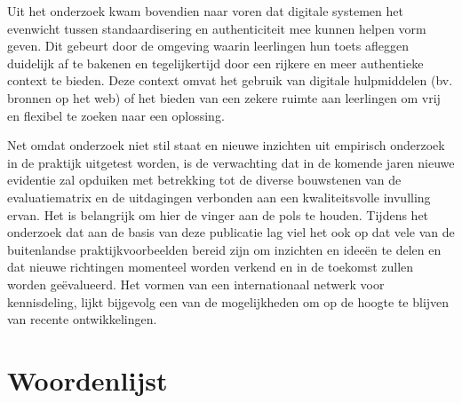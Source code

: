 \documentclass[
  letterpaper,
]{report}
\begin{document}
Uit het onderzoek kwam bovendien naar voren dat digitale systemen het
evenwicht tussen standaardisering en authenticiteit mee kunnen helpen
vorm geven. Dit gebeurt door de omgeving waarin leerlingen hun toets
afleggen duidelijk af te bakenen en tegelijkertijd door een rijkere en
meer authentieke context te bieden. Deze context omvat het gebruik van
digitale hulpmiddelen (bv. bronnen op het web) of het bieden van een
zekere ruimte aan leerlingen om vrij en flexibel te zoeken naar een
oplossing.

Net omdat onderzoek niet stil staat en nieuwe inzichten uit empirisch
onderzoek in de praktijk uitgetest worden, is de verwachting dat in de
komende jaren nieuwe evidentie zal opduiken met betrekking tot de
diverse bouwstenen van de evaluatiematrix en de uitdagingen verbonden
aan een kwaliteitsvolle invulling ervan. Het is belangrijk om hier de
vinger aan de pols te houden. Tijdens het onderzoek dat aan de basis van
deze publicatie lag viel het ook op dat vele van de buitenlandse
praktijkvoorbeelden bereid zijn om inzichten en ideeën te delen en dat
nieuwe richtingen momenteel worden verkend en in de toekomst zullen
worden geëvalueerd. Het vormen van een internationaal netwerk voor
kennisdeling, lijkt bijgevolg een van de mogelijkheden om op de hoogte
te blijven van recente ontwikkelingen.

\hypertarget{woordenlijst}{%
\chapter*{Woordenlijst}\label{woordenlijst}}
\end{document}
